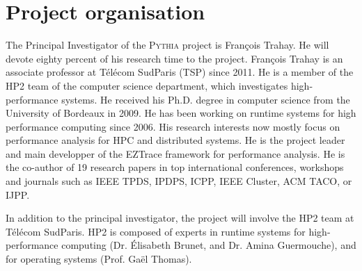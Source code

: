 \documentclass[a4paper,11pt,defblank]{article}
\newcommand{\pname}{\textsc{Pythia}\xspace}
\begin{document}
\section{Project organisation}

The Principal Investigator of the \pname project is François Trahay. He
will devote eighty percent of his research time to the project.
François Trahay is an associate professor at Télécom SudParis (TSP)
since 2011.
%
He is a member of the HP2 team of the computer science
department, which investigates high-performance systems.
%
He received his Ph.D. degree in computer science from the University
of Bordeaux in 2009. He has been working on runtime systems for high
performance computing since 2006. His research interests now mostly
focus on performance analysis for HPC and distributed systems. He is
the project leader and main developper of the EZTrace framework for
performance analysis.
%
He is the co-author of 19 research papers in top international
conferences, workshops and journals such as IEEE TPDS, IPDPS, ICPP, IEEE
Cluster, ACM TACO, or IJPP.

In addition to the principal investigator, the project will involve
the HP2 team at Télécom SudParis. HP2 is composed of experts in
runtime systems for high-performance computing (Dr. {\'E}lisabeth
Brunet, and Dr. Amina Guermouche), and for operating systems
(Prof. Gaël Thomas).%
\end{document}
